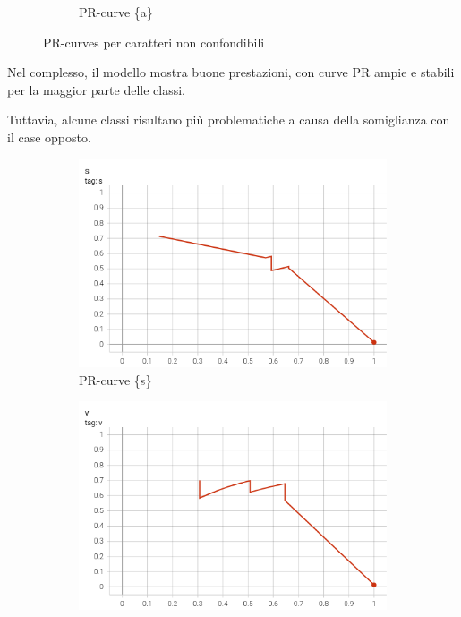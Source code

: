 \begin{figure}[htbp]
\begin{subfigure}[t]{0.32\textwidth}
        \caption{PR-curve \{a\}}
    \end{subfigure}
    \caption{PR-curves per caratteri non confondibili}
    \label{fig:pr_curves}
\end{figure}

Nel complesso, il modello mostra buone prestazioni, con curve PR ampie e stabili per la maggior parte delle classi.

Tuttavia, alcune classi risultano più problematiche a causa della somiglianza con il case opposto.
\begin{figure}[htbp]
    \centering
    \begin{subfigure}[t]{0.32\textwidth}
        \centering
        \includegraphics[width=\textwidth]{images/pr_curve_conf1.png}
        \caption{PR-curve \{s\}}
    \end{subfigure}
    \begin{subfigure}[t]{0.32\textwidth}
        \centering
        \includegraphics[width=\textwidth]{images/pr_curve_conf2.png}

\end{subfigure}
\end{figure}
